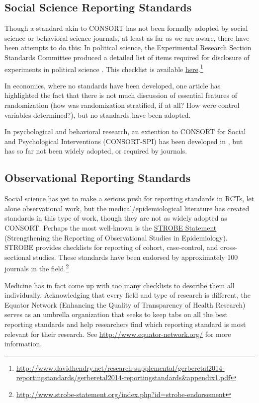 \documentclass[12pt] {article}
\begin{document}
\subsection{Social Science Reporting Standards}\label{soc-sci-standards}
Though a standard akin to CONSORT has not been formally adopted by social science or behavioral science journals, at least as far as we are aware, there have been attempts to do this: In political science, the Experimental Research Section Standards Committee produced a detailed list of items required for disclosure of experiments in political science \citep{gerber_reporting_????}. This checklist is available \href{http://www.davidhendry.net/research-supplemental/gerberetal2014-reportingstandards/gerberetal2014-reportingstandards&appendix1.pdf}{here}.\footnote{\url{http://www.davidhendry.net/research-supplemental/gerberetal2014-reportingstandards/gerberetal2014-reportingstandards&appendix1.pdf}}

In economics, where no standards have been developed, one article has highlighted the fact that there is not much discussion of essential features of randomization (how was randomization stratified, if at all? How were control variables determined?), but no standards have been adopted. \citep{bruhn_pursuit_2009}

In psychological and behavioral research, an extention to CONSORT for Social and Psychological Interventions (CONSORT-SPI) has been developed in \citep{montgomery2013protocol}, but has so far not been widely adopted, or required by journals. 

\subsection{Observational Reporting Standards}\label{observational-standards}
Social science has yet to make a serious push for reporting standards in RCTs, let alone observational work, but the medical/epidemiological literature has created standards in this type of work, though they are not as widely adopted as CONSORT. Perhaps the most well-known is the \href{http://www.strobe-statement.org}{STROBE Statement} (Strengthening the Reporting of Observational Studies in Epidemiology). STROBE provides checklists for reporting of cohort, case-control, and cross-sectional studies. These standards have been endorsed by approximately 100 journals in the field.\footnote{\url{http://www.strobe-statement.org/index.php?id=strobe-endorsement}}

Medicine has in fact come up with too many checklists to describe them all individually. Acknowledging that every field and type of research is different, the Equator Network (Enhancing the Quality of Transparency of Health Research) serves as an umbrella organization that seeks to keep tabs on all the best reporting standards and help researchers find which reporting standard is most relevant for their research. See \url{http://www.equator-network.org/} for more information.
\end{document}
